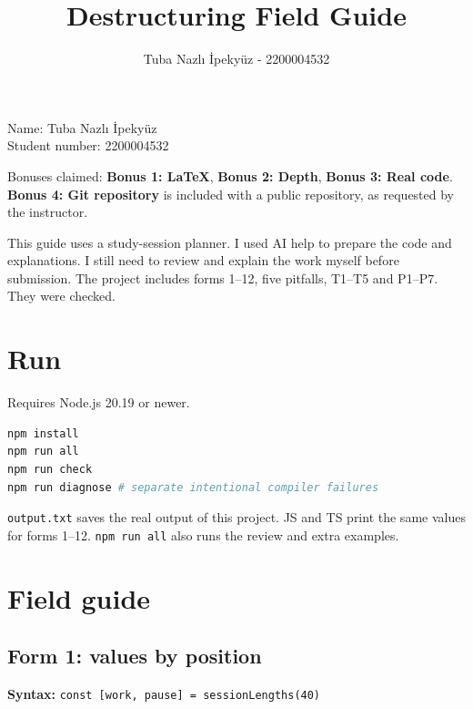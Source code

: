 \documentclass[
  10pt,
  a4paper,
]{article}
\title{Destructuring Field Guide}
\author{Tuba Nazlı İpekyüz - 2200004532}
\date{}
\begin{document}
\maketitle

{
\setcounter{tocdepth}{3}
\tableofcontents
}
Name: Tuba Nazlı İpekyüz\\
Student number: 2200004532

Bonuses claimed: \textbf{Bonus 1: LaTeX}, \textbf{Bonus 2: Depth},
\textbf{Bonus 3: Real code}. \textbf{Bonus 4: Git repository} is
included with a public repository, as requested by the instructor.

This guide uses a study-session planner. I used AI help to prepare the
code and explanations. I still need to review and explain the work
myself before submission. The project includes forms 1--12, five
pitfalls, T1--T5 and P1--P7. They were checked.

\section{Run}\label{run}

Requires Node.js 20.19 or newer.

\begin{minipage}{\linewidth}

\begin{lstlisting}[language=sh]
npm install
npm run all
npm run check
npm run diagnose # separate intentional compiler failures
\end{lstlisting}

\end{minipage}\par

\texttt{output.\allowbreak{}txt} saves the real output of this project.
JS and TS print the same values for forms 1--12. \texttt{npm run all}
also runs the review and extra examples.

\clearpage

\section{Field guide}\label{field-guide}

\subsection{Form 1: values by position}\label{form-1-values-by-position}

\textbf{Syntax:} \texttt{const [work, pause] = sessionLengths(40)}
\end{document}

